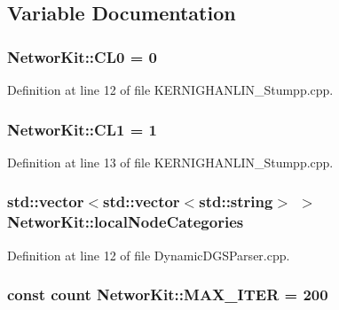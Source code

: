 \subsection{Variable Documentation}
\hypertarget{namespace_networ_kit_ac775c85228933ad06cfd57f3ae397ec4}{
\subsubsection[{C\-L0}]{ Networ\-Kit\-::\-C\-L0 = 0}}\label{namespace_networ_kit_ac775c85228933ad06cfd57f3ae397ec4}


Definition at line 12 of file K\-E\-R\-N\-I\-G\-H\-A\-N\-L\-I\-N\-\_\-\-Stumpp.\-cpp.

\hypertarget{namespace_networ_kit_ac7af040d704205102a91474b7ed6f923}{
\subsubsection[{C\-L1}]{ Networ\-Kit\-::\-C\-L1 = 1}}\label{namespace_networ_kit_ac7af040d704205102a91474b7ed6f923}


Definition at line 13 of file K\-E\-R\-N\-I\-G\-H\-A\-N\-L\-I\-N\-\_\-\-Stumpp.\-cpp.

\hypertarget{namespace_networ_kit_abe047b75f75755f8731975966e4d1fa5}{
\subsubsection[{local\-Node\-Categories}]{\setlength{\rightskip}{0pt plus 5cm}std\-::vector$<$std\-::vector$<$std\-::string$>$ $>$ Networ\-Kit\-::local\-Node\-Categories}}\label{namespace_networ_kit_abe047b75f75755f8731975966e4d1fa5}


Definition at line 12 of file Dynamic\-D\-G\-S\-Parser.\-cpp.

\hypertarget{namespace_networ_kit_a8fbda1865e8f5153404bad7c20dc166e}{
\subsubsection[{M\-A\-X\-\_\-\-I\-T\-E\-R}]{\setlength{\rightskip}{0pt plus 5cm}const {\bf count} Networ\-Kit\-::\-M\-A\-X\-\_\-\-I\-T\-E\-R = 200}}\label{namespace_networ_kit_a8fbda1865e8f5153404bad7c20dc166e}


